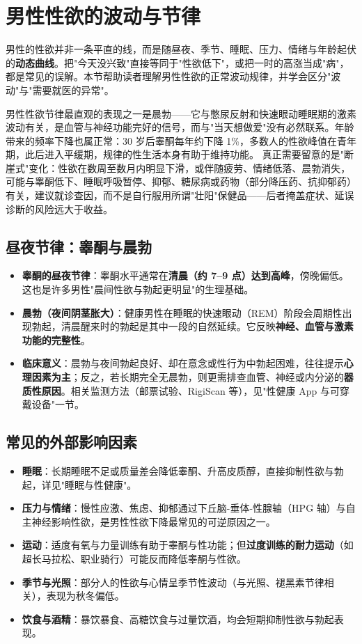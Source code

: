 \section{男性性欲的波动与节律}

男性的性欲并非一条平直的线，而是随昼夜、季节、睡眠、压力、情绪与年龄起伏的\textbf{动态曲线}。把"今天没兴致"直接等同于"性欲低下"，或把一时的高涨当成"病"，都是常见的误解。本节帮助读者理解男性性欲的正常波动规律，并学会区分"波动"与"需要就医的异常"。


男性性欲节律最直观的表现之一是晨勃——它与憋尿反射和快速眼动睡眠期的激素波动有关，是血管与神经功能完好的信号，而与"当天想做爱"没有必然联系。年龄带来的频率下降也属正常：30 岁后睾酮每年约下降 1\%，多数人的性欲峰值在青年期，此后进入平缓期，规律的性生活本身有助于维持功能。
真正需要留意的是"断崖式"变化：性欲在数周至数月内明显下滑，或伴随疲劳、情绪低落、晨勃消失，可能与睾酮低下、睡眠呼吸暂停、抑郁、糖尿病或药物（部分降压药、抗抑郁药）有关，建议就诊查因，而不是自行服用所谓"壮阳"保健品——后者掩盖症状、延误诊断的风险远大于收益。

\subsection{昼夜节律：睾酮与晨勃}

\begin{itemize}
	\item \textbf{睾酮的昼夜节律}：睾酮水平通常在\textbf{清晨（约 7--9 点）达到高峰}，傍晚偏低。这也是许多男性"晨间性欲与勃起更明显"的生理基础。
	\item \textbf{晨勃（夜间阴茎胀大）}：健康男性在睡眠的快速眼动（REM）阶段会周期性出现勃起，清晨醒来时的勃起是其中一段的自然延续。它反映\textbf{神经、血管与激素功能的完整性}。
	\item \textbf{临床意义}：晨勃与夜间勃起良好、却在意念或性行为中勃起困难，往往提示\textbf{心理因素为主}；反之，若长期完全无晨勃，则更需排查血管、神经或内分泌的\textbf{器质性原因}。相关监测方法（邮票试验、RigiScan 等），见"性健康 App 与可穿戴设备"一节。
\end{itemize}

\subsection{常见的外部影响因素}

\begin{itemize}
	\item \textbf{睡眠}：长期睡眠不足或质量差会降低睾酮、升高皮质醇，直接抑制性欲与勃起，详见"睡眠与性健康"。
	\item \textbf{压力与情绪}：慢性应激、焦虑、抑郁通过下丘脑-垂体-性腺轴（HPG 轴）与自主神经影响性欲，是男性性欲下降最常见的可逆原因之一。
	\item \textbf{运动}：适度有氧与力量训练有助于睾酮与性功能；但\textbf{过度训练的耐力运动}（如超长马拉松、职业骑行）可能反而降低睾酮与性欲。
	\item \textbf{季节与光照}：部分人的性欲与心情呈季节性波动（与光照、褪黑素节律相关），表现为秋冬偏低。
	\item \textbf{饮食与酒精}：暴饮暴食、高糖饮食与过量饮酒，均会短期抑制性欲与勃起表现。
\end{itemize}

